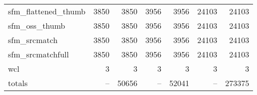 \begin{table}[h]
\begin{longtable}{lrrrrrr}
		sfm\_flattened\_thumb & 3850 & 3850 & 3956 & 3956 & 24103 & 24103 \\
		sfm\_oss\_thumb & 3850 & 3850 & 3956 & 3956 & 24103 & 24103 \\
		sfm\_srcmatch & 3850 & 3850 & 3956 & 3956 & 24103 & 24103 \\
		sfm\_srcmatchfull & 3850 & 3850 & 3956 & 3956 & 24103 & 24103 \\
		wcl\ddag & 3 & 3 & 3 & 3 & 3 & 3 \\
		\hline
		totals & -- & 50656 & -- & 52041 & -- & 273375 \\
		\hline\hline
	\end{longtable}
\end{table}
